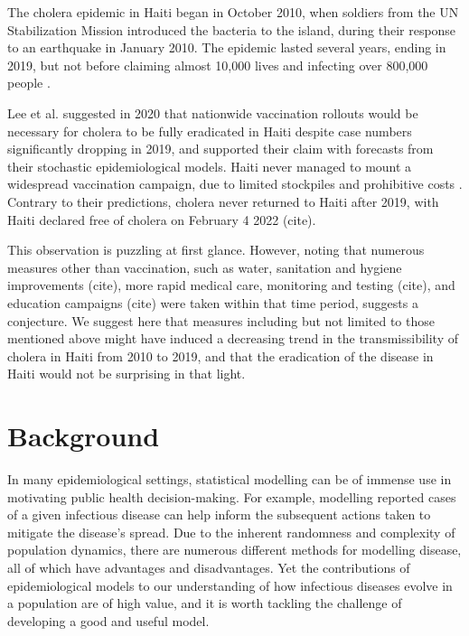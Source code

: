 \documentclass[12pt]{article}
\begin{document}
  The cholera epidemic in Haiti began in October 2010, when soldiers from the UN Stabilization Mission introduced the bacteria to the island, during their response to an earthquake in January 2010. The epidemic lasted several years, ending in 2019, but not before claiming almost 10,000 lives and infecting over 800,000 people \cite{Lee_haiticholera}. 
  
  Lee et al. \cite{Lee_haiticholera} suggested in 2020 that nationwide vaccination rollouts would be necessary for cholera to be fully eradicated in Haiti despite case numbers significantly dropping in 2019, and supported their claim with forecasts from their stochastic epidemiological models. Haiti never managed to mount a widespread vaccination campaign, due to limited stockpiles and prohibitive costs \cite{rebaudet}. Contrary to their predictions, cholera never returned to Haiti after 2019, with Haiti declared free of cholera on February 4 2022 (cite). 
  
  This observation is puzzling at first glance. However, noting that numerous measures other than vaccination, such as water, sanitation and hygiene improvements (cite), more rapid medical care, monitoring and testing (cite), and education campaigns (cite) were taken within that time period, suggests a conjecture. We suggest here that measures including but not limited to those mentioned above might have induced a decreasing trend in the transmissibility of cholera in Haiti from 2010 to 2019, and that the eradication of the disease in Haiti would not be surprising in that light.


\section{Background}


 In many epidemiological settings, statistical modelling can be of immense use in motivating public health decision-making. For example, modelling reported cases of a given infectious disease can help inform the subsequent actions taken to mitigate the disease's spread. Due to the inherent randomness and complexity of population dynamics, there are numerous different methods for modelling disease, all of which have advantages and disadvantages. Yet the contributions of epidemiological models to our understanding of how infectious diseases evolve in a population are of high value, and it is worth tackling the challenge of developing a good and useful model.
  
\end{document}
